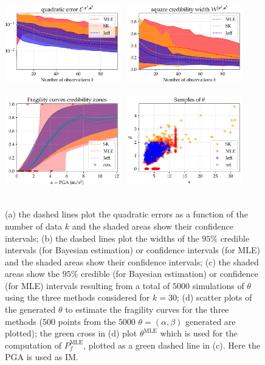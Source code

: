   
          
    \begin{figure}[h]
        \centering
        {\includegraphics[width=5cm]{figures/uncIM/err_quadra_ASG_PGA.pdf}}\ %
        {\includegraphics[width=5cm]{figures/uncIM/err_cred_ASG_PGA.pdf}} \\
        \ \\
        {\includegraphics[width=5cm]{figures/uncIM/curves_ASG_PGA.pdf}}\ %
        {\includegraphics[width=5cm]{figures/uncIM/scatter_ASG_PGA.pdf}}\\
        \ 
         \caption{(a) the dashed lines plot the quadratic errors as a function of the number of data $k$ and the shaded areas show their confidence intervals; (b) the dashed lines plot the widths of the $95\%$ credible intervals (for Bayesian estimation) or confidence intervals (for MLE) and the shaded areas show their confidence intervals; (c) %
         the shaded areas show the $95\%$ credible (for Bayesian estimation) or confidence (for MLE) intervals resulting from a total of $5000$ simulations of $\theta$ using the three methods considered for $k = 30$; (d) scatter plots of the generated $\theta$ to estimate the fragility curves for the three methods ($500$ points from the $5000$ $\theta=(\alpha,\beta)$ generated are plotted); the green cross in (d) plot $\theta^{\mathrm{MLE}}$ which is used for the computation of $P_f^{\mathrm{MLE}}$, plotted as a green dashed line in (c). Here the PGA is used as IM.}
           \label{uncIM:fig:ASG-curves-PGA}
    \end{figure}

